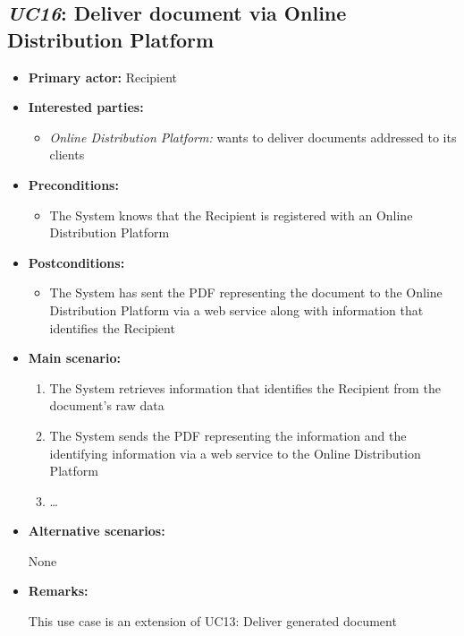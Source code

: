 \documentclass[a4paper,10pt]{article}
\begin{document}
\subsection{\emph{UC16}: Deliver document via Online Distribution Platform}
\begin{itemize}
    \item \textbf{Primary actor:} Recipient
    \item \textbf{Interested parties:} 
        \begin{itemize}
            \item \textit{Online Distribution Platform:} wants to deliver documents addressed to its clients
        \end{itemize}

    \item \textbf{Preconditions:}
        \begin{itemize}
            \item The System knows that the Recipient is registered with an Online Distribution Platform
        \end{itemize}

    \item \textbf{Postconditions:}
        \begin{itemize}
            \item The System has sent the PDF representing the document to the Online Distribution Platform via a web service along with information
            that identifies the Recipient
        \end{itemize}
        
    \item \textbf{Main scenario:} 
    \begin{enumerate}
       \item The System retrieves information that identifies the Recipient from the document's raw data
       \item The System sends the PDF representing the information and the identifying information via a web service to the Online Distribution Platform
       \item \ldots
    \end{enumerate}

    \item \textbf{Alternative scenarios:} 
    \begin{enumerate}
        None
    \end{enumerate}
    
    \item \textbf{Remarks:}
        \begin{itemize}
            This use case is an extension of UC13: Deliver generated document
        \end{itemize}
\end{itemize}
\end{document}
